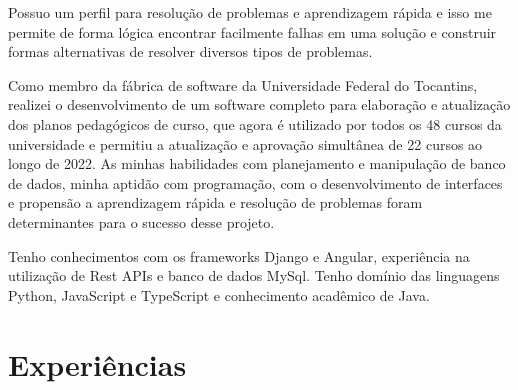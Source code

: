 \documentclass[a4paper,12pt]{article}
\begin{document}
Possuo um perfil para resolução de problemas e aprendizagem rápida e isso me permite de forma lógica encontrar facilmente falhas em uma solução e construir formas alternativas de resolver diversos tipos de problemas.

Como membro da fábrica de software da Universidade Federal do Tocantins, realizei o desenvolvimento de um software completo para elaboração e atualização dos planos pedagógicos de curso, que agora é utilizado por todos os 48 cursos da universidade e permitiu a atualização e aprovação simultânea de 22 cursos ao longo de 2022. As minhas habilidades com planejamento e manipulação de banco de dados, minha aptidão com programação, com o desenvolvimento de interfaces e propensão a aprendizagem rápida e resolução de problemas foram determinantes para o sucesso desse projeto.

Tenho conhecimentos com os frameworks Django e Angular, experiência na utilização de Rest APIs e banco de dados MySql. Tenho domínio das linguagens Python, JavaScript e TypeScript e conhecimento acadêmico de Java.
\section{Experiências}
\end{document}
